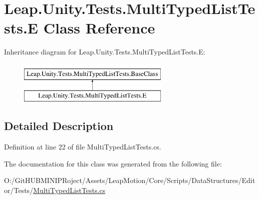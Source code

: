 \hypertarget{class_leap_1_1_unity_1_1_tests_1_1_multi_typed_list_tests_1_1_e}{}\section{Leap.\+Unity.\+Tests.\+Multi\+Typed\+List\+Tests.\+E Class Reference}
\label{class_leap_1_1_unity_1_1_tests_1_1_multi_typed_list_tests_1_1_e}
Inheritance diagram for Leap.\+Unity.\+Tests.\+Multi\+Typed\+List\+Tests.\+E\+:\begin{figure}[H]
\begin{center}
\leavevmode
\includegraphics[height=2.000000cm]{class_leap_1_1_unity_1_1_tests_1_1_multi_typed_list_tests_1_1_e}
\end{center}
\end{figure}


\subsection{Detailed Description}


Definition at line 22 of file Multi\+Typed\+List\+Tests.\+cs.



The documentation for this class was generated from the following file\+:\begin{DoxyCompactItemize}
\item 
O\+:/\+Git\+H\+U\+B\+M\+I\+N\+I\+P\+Roject/\+Assets/\+Leap\+Motion/\+Core/\+Scripts/\+Data\+Structures/\+Editor/\+Tests/\mbox{\hyperlink{_multi_typed_list_tests_8cs}{Multi\+Typed\+List\+Tests.\+cs}}\end{DoxyCompactItemize}
